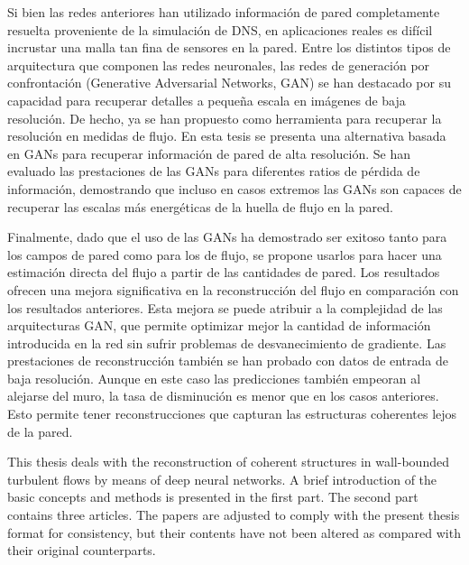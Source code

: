 \begin{abstrakt}
	Si bien las redes anteriores han utilizado información de pared completamente resuelta proveniente de la simulación de DNS, en aplicaciones reales es difícil incrustar una malla tan fina de sensores en la pared.
	Entre los distintos tipos de arquitectura que componen las redes neuronales, las redes de generación por confrontación (Generative Adversarial Networks, GAN) se han destacado por su capacidad para recuperar detalles a pequeña escala en imágenes de baja resolución.
	De hecho, ya se han propuesto como herramienta para recuperar la resolución en medidas de flujo.
	En esta tesis se presenta una alternativa basada en GANs para recuperar información de pared de alta resolución.
	Se han evaluado las prestaciones de las GANs para diferentes ratios de pérdida de información, demostrando que incluso en casos extremos las GANs son capaces de recuperar las escalas más energéticas de la huella de flujo en la pared.

	Finalmente, dado que el uso de las GANs ha demostrado ser exitoso tanto para los campos de pared como para los de flujo, se propone usarlos para hacer una estimación directa del flujo a partir de las cantidades de pared.
	Los resultados ofrecen una mejora significativa en la reconstrucción del flujo en comparación con los resultados anteriores.
	Esta mejora se puede atribuir a la complejidad de las arquitecturas GAN, que permite optimizar mejor la cantidad de información introducida en la red sin sufrir problemas de desvanecimiento de gradiente.
	Las prestaciones de reconstrucción también se han probado con datos de entrada de baja resolución.
	Aunque en este caso las predicciones también empeoran al alejarse del muro, la tasa de disminución es menor que en los casos anteriores.
	Esto permite tener reconstrucciones que capturan las estructuras coherentes lejos de la pared.
\end{abstrakt}


%
\begin{preface}
	This thesis deals with the reconstruction of coherent structures in wall-bounded turbulent flows by means of deep neural networks.
	A brief introduction of the basic concepts and methods is presented in the first part.
	The second part contains three articles.
	The papers are adjusted to comply with the present thesis format for consistency, but their contents have not been altered as compared with their original counterparts.
\end{preface}



